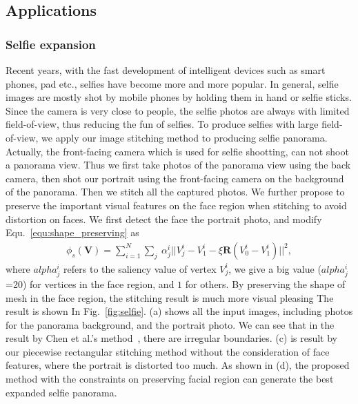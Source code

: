 \documentclass[10pt,journal,compsoc]{IEEEtran}
\begin{document}
 \subsection{Applications}

 \subsubsection{Selfie expansion}

Recent years, with the fast development of intelligent devices such as smart phones, pad etc., selfies have become more and more popular.
In general, selfie images are mostly shot by mobile phones by holding them in hand or selfie sticks.
Since the camera is very close to people, the selfie photos are always with limited field-of-view, thus reducing the fun of selfies.
To produce selfies with large field-of-view, we apply our image stitching method to producing selfie panorama.
Actually, the front-facing camera which is used for selfie shootting, can not shoot a panorama view.
Thus we first take photos of the panorama view using the back camera, then shot our portrait using the front-facing camera on the background of the panorama. Then we stitch all the captured photos. We further propose to preserve the important visual features on the face region when stitching to avoid distortion on faces.
We first detect the face the portrait photo, and modify Equ.~\ref{equ:shape_preserving} as
\begin{equation} \label{equ:shape_preserving1}
\begin{split}
    \phi_s(\mathbf{V}) = \sum\limits_{i=1}^N\sum\limits_{j} \
    \alpha_j^i||V_j^i -V_1^i-\xi \mathbf{R}(V_0^i -V_1^i)||^2,
\end{split}
\end{equation}
where $alpha_j^i$ refers to the saliency value of vertex $V_j^i $, we give a big value ($alpha_j^i$=20) for vertices in the face region, and $1$ for others. By preserving the shape of  mesh in the face region, the stitching result is much more visual pleasing
The result is shown In Fig.~\ref{fig:selfie}. (a) shows all the input images, including photos for the panorama background, and the portrait photo.
We can see that in the result by Chen et al.'s method~\cite{conf/eccv/ChenC16}, there are irregular boundaries.
(c) is result by our piecewise rectangular stitching method without the consideration of face features, where the portrait is distorted too much.
As shown in (d), the proposed method with the constraints on preserving facial region can generate the best expanded selfie panorama.
\end{document}
